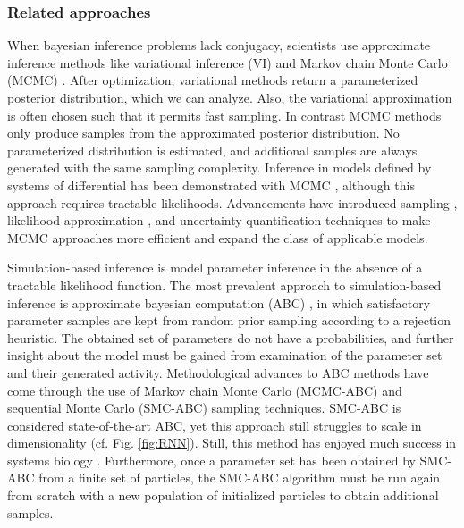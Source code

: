 \documentclass[11pt]{article}
\begin{document}
 \subsubsection{Related approaches}\label{methods_related}
When bayesian inference problems lack conjugacy, scientists use approximate inference methods like variational inference (VI) \cite{saul1998mean} and Markov chain Monte Carlo (MCMC) \cite{metropolis1953equation, hastings1970monte}. 
After optimization, variational methods return a parameterized posterior distribution, which we can analyze.
Also, the variational approximation is often chosen such that it permits fast sampling.
In contrast MCMC methods only produce samples from the approximated posterior distribution.
No parameterized distribution is estimated, and additional samples are always generated with the same sampling complexity.
Inference in models defined by systems of differential has been demonstrated with MCMC \cite{girolami2011riemann}, although this approach requires tractable likelihoods.
Advancements have introduced sampling \cite{calderhead2011statistical}, likelihood approximation \cite{golightly2011bayesian}, and uncertainty quantification techniques \cite{chkrebtii2016bayesian} to make MCMC approaches more efficient and expand the class of applicable models.
 
Simulation-based inference \cite{cranmer2020frontier} is model parameter inference in the absence of a tractable likelihood function.
The most prevalent approach to simulation-based inference is approximate bayesian computation (ABC) \cite{beaumont2002approximate}, in which satisfactory parameter samples are kept from random prior sampling according to a rejection heuristic.
The obtained set of parameters do not have a probabilities, and further insight about the model must be gained from examination of the parameter set and their generated activity.
Methodological advances to ABC methods have come through the use of Markov chain Monte Carlo (MCMC-ABC) \cite{marjoram2003markov} and sequential Monte Carlo (SMC-ABC) \cite{sisson2007sequential} sampling techniques.
SMC-ABC is considered state-of-the-art ABC, yet this approach still struggles to scale in dimensionality \cite{sisson2018handbook} (cf. Fig. \ref{fig:RNN}).
Still, this method has enjoyed much success in systems biology \cite{liepe2014framework}.
Furthermore, once a parameter set has been obtained by SMC-ABC from a finite set of particles, the SMC-ABC algorithm must be run again from scratch with a new population of initialized particles to obtain additional samples.
\end{document}
